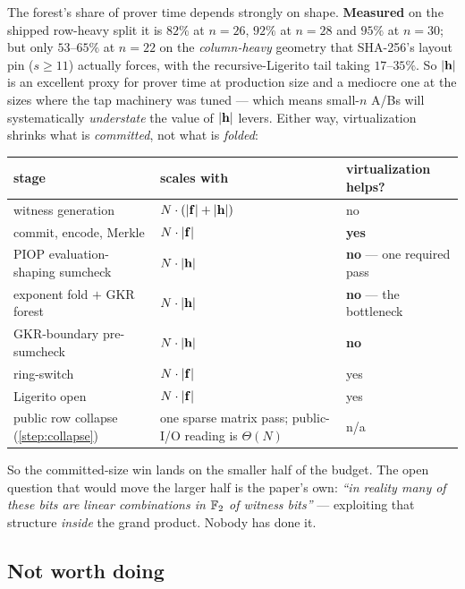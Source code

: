 The forest's share of prover time depends strongly on shape. \textbf{Measured}
on the shipped row-heavy split it is $82\%$ at $n{=}26$, $92\%$ at $n{=}28$ and
$95\%$ at $n{=}30$; but only $53$--$65\%$ at $n{=}22$ on the \emph{column-heavy}
geometry that SHA-256's layout pin ($s\geq11$) actually forces, with the
recursive-Ligerito tail taking $17$--$35\%$. So $|\mathbf{h}|$ is an excellent proxy for
prover time at production size and a mediocre one at the sizes where the tap
machinery was tuned --- which means small-$n$ A/Bs will systematically
\emph{understate} the value of $|\mathbf{h}|$ levers. Either way, virtualization shrinks
what is \emph{committed}, not what is \emph{folded}:

\begin{center}\small
\begin{tabular}{@{}p{}p{}p{}@{}}
\toprule
stage & scales with & virtualization helps?\\
\midrule
witness generation & $N\cdot(|\mathbf{f}|+|\mathbf{h}|)$ & no\\
commit, encode, Merkle & $N\cdot|\mathbf{f}|$ & \textbf{yes}\\
PIOP evaluation-shaping sumcheck & $N\cdot|\mathbf{h}|$ & \textbf{no} --- one required pass\\
exponent fold $+$ GKR forest & $N\cdot|\mathbf{h}|$ & \textbf{no} --- the bottleneck\\
GKR-boundary pre-sumcheck & $N\cdot|\mathbf{h}|$ & \textbf{no}\\
ring-switch & $N\cdot|\mathbf{f}|$ & yes\\
Ligerito open & $N\cdot|\mathbf{f}|$ & yes\\
public row collapse (\cref{step:collapse}) & one sparse matrix pass; public-I/O reading is $\Theta(N)$ & n/a\\
\bottomrule
\end{tabular}
\end{center}

So the committed-size win lands on the smaller half of the budget. The
open question that would move the larger half is the paper's own: \emph{``in
reality many of these bits are linear combinations in $\mathbb{F}_2$ of witness
bits''} --- exploiting that structure \emph{inside} the grand product. Nobody has
done it.

\subsection{Not worth doing}

